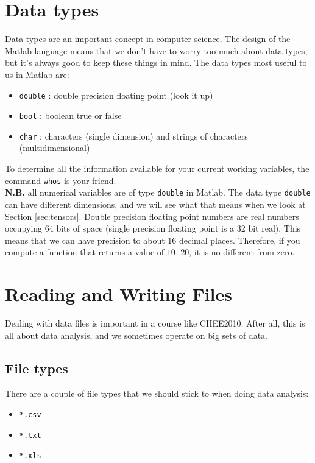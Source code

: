 \documentclass[12pt]{article}
\begin{document}
\newpage
\section{Data types}
Data types are an important concept in computer science. The design of the Matlab language means that we don't have to worry too much about data types, but it's always good to keep these things in mind. The data types most useful to us in Matlab are:
\begin{itemize}
\item \texttt{double} : double precision floating point (look it up)
\item \texttt{bool} : boolean true or false
\item \texttt{char} : characters (single dimension) and strings of characters (multidimensional)
\end{itemize}

To determine all the information available for your current working variables, the command \texttt{whos} is your friend.\\

\textbf{N.B.} all numerical variables are of type \texttt{double} in Matlab. The data type \texttt{double} can have different dimensions, and we will see what that means when we look at Section \ref{sec:tensors}. Double precision floating point numbers are real numbers occupying 64 bits of space (single precision floating point is a 32 bit real). This means that we can have precision to about 16 decimal places. Therefore, if you compute a function that returns a value of $10^-20$, it is no different from zero. 


\section{Reading and Writing Files}
Dealing with data files is important in a course like CHEE2010. After all, this is all about data analysis, and we sometimes operate on big sets of data. \\

\subsection{File types}
There are a couple of file types that we should stick to when doing data analysis:
\begin{itemize}
\item \texttt{*.csv}
\item \texttt{*.txt}
\item \texttt{*.xls}
\end{itemize}
\end{document}
